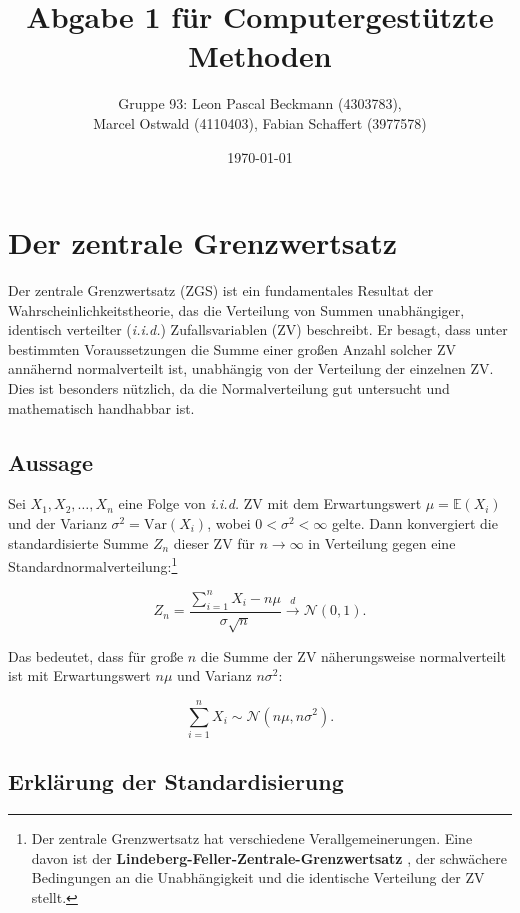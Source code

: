 \documentclass{article}
\title{Abgabe 1 für Computergestützte Methoden}
\author{Gruppe 93: Leon Pascal Beckmann (4303783), \\ Marcel Ostwald (4110403), Fabian Schaffert (3977578)}
\date{\today}
\begin{document}
\maketitle
\tableofcontents

\newpage

\section{Der zentrale Grenzwertsatz}

Der zentrale Grenzwertsatz (ZGS) ist ein fundamentales Resultat der Wahrscheinlichkeitstheorie, das die Verteilung von Summen unabhängiger, identisch verteilter (\textit{i.i.d.}) Zufallsvariablen (ZV) beschreibt. Er besagt, dass unter bestimmten Voraussetzungen die Summe einer großen Anzahl solcher ZV annähernd normalverteilt ist, unabhängig von der Verteilung der einzelnen ZV. Dies ist besonders nützlich, da die Normalverteilung gut untersucht und mathematisch handhabbar ist.

\subsection{Aussage}

Sei \( X_1, X_2, \dots, X_n \) eine Folge von \textit{i.i.d.} ZV mit dem Erwartungswert \( \mu = \mathbb{E}(X_i) \) und der Varianz \( \sigma^2 = \text{Var}(X_i) \), wobei \( 0 < \sigma^2 < \infty \) gelte. Dann konvergiert die standardisierte Summe \( Z_n \) dieser ZV für \( n \to \infty \) in Verteilung gegen eine Standardnormalverteilung:\footnote{Der zentrale Grenzwertsatz hat verschiedene Verallgemeinerungen. Eine davon ist der
\textbf{Lindeberg-Feller-Zentrale-Grenzwertsatz} \cite[Seite 328]{klenke}, der schwächere Bedingungen an
die Unabhängigkeit und die identische Verteilung der ZV stellt.}

\begin{equation}
\label{eq:1}
Z_n = \frac{\sum_{i=1}^n X_i - n\mu}{\sigma \sqrt{n}} \xrightarrow{d} \mathcal{N}(0,1).
\end{equation}


\noindent Das bedeutet, dass für große \( n \) die Summe der ZV näherungsweise normalverteilt ist mit Erwartungswert \( n\mu \) und Varianz \( n\sigma^2 \):

\begin{equation}
\label{eq:2}
\sum_{i=1}^n X_i \sim \mathcal{N}(n\mu, n\sigma^2).
\end{equation}


\subsection{Erklärung der Standardisierung}
\end{document}
